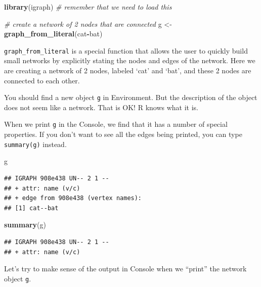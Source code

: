 \documentclass[
]{book}
\newenvironment{Shaded}{\begin{snugshade}}{\end{snugshade}}
\newcommand{\CommentTok}[1]{\textcolor[rgb]{0.56,0.35,0.01}{\textit{#1}}}
\newcommand{\FunctionTok}[1]{\textcolor[rgb]{0.13,0.29,0.53}{\textbf{#1}}}
\newcommand{\NormalTok}[1]{#1}
\newcommand{\OtherTok}[1]{\textcolor[rgb]{0.56,0.35,0.01}{#1}}
\newcommand{\SpecialCharTok}[1]{\textcolor[rgb]{0.81,0.36,0.00}{\textbf{#1}}}
\newcommand{\StringTok}[1]{\textcolor[rgb]{0.31,0.60,0.02}{#1}}
\begin{document}
\begin{Shaded}
\begin{Highlighting}[]
\FunctionTok{library}\NormalTok{(igraph) }\CommentTok{\# remember that we need to load this}

\CommentTok{\# create a network of 2 nodes that are connected}
\NormalTok{g }\OtherTok{\textless{}{-}} \FunctionTok{graph\_from\_literal}\NormalTok{(}\StringTok{\textquotesingle{}cat\textquotesingle{}}\SpecialCharTok{{-}}\StringTok{\textquotesingle{}bat\textquotesingle{}}\NormalTok{)}
\end{Highlighting}
\end{Shaded}

\texttt{graph\_from\_literal} is a special function that allows the user to quickly build small networks by explicitly stating the nodes and edges of the network. Here we are creating a network of 2 nodes, labeled `cat' and `bat', and these 2 nodes are connected to each other.

You should find a new object \texttt{g} in Environment. But the description of the object does not seem like a network. That is OK! R knows what it is.

When we print \texttt{g} in the Console, we find that it has a number of special properties. If you don't want to see all the edges being printed, you can type \texttt{summary(g)} instead.

\begin{Shaded}
\begin{Highlighting}[]
\NormalTok{g}
\end{Highlighting}
\end{Shaded}

\begin{verbatim}
## IGRAPH 908e438 UN-- 2 1 -- 
## + attr: name (v/c)
## + edge from 908e438 (vertex names):
## [1] cat--bat
\end{verbatim}

\begin{Shaded}
\begin{Highlighting}[]
\FunctionTok{summary}\NormalTok{(g)}
\end{Highlighting}
\end{Shaded}

\begin{verbatim}
## IGRAPH 908e438 UN-- 2 1 -- 
## + attr: name (v/c)
\end{verbatim}

Let's try to make sense of the output in Console when we ``print'' the network object \texttt{g}.
\end{document}
